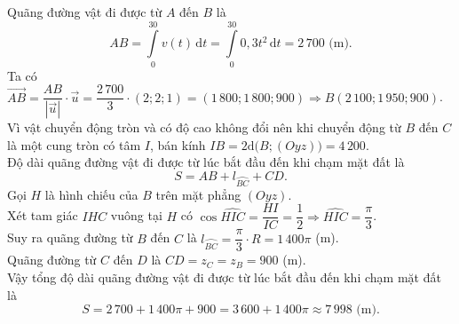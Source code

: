 \begin{ex}
{\begin{center}
\begin{tikzpicture}[scale=1.1, line join=round, line cap=round, >=stealth]
			\end{tikzpicture}
		\end{center}
		Quãng đường vật đi được từ $A$ đến $B$ là 
		\[AB = \displaystyle \int\limits_0^{30} v(t) \mathrm{\,d}t = \int\limits_0^{30} 0{,}3t^2 \mathrm{\,d}t = 2\,700\text{ (m).}\]
		Ta có $\overrightarrow{AB} = \dfrac{AB}{\left|\overrightarrow{u}\right|} \cdot \overrightarrow{u} = \dfrac{2\,700}{3}\cdot (2; 2; 1) = (1\,800; 1\,800; 900) \Rightarrow B(2\,100; 1\,950; 900)$.\\
		Vì vật chuyển động tròn và có độ cao không đổi nên khi chuyển động từ $B$ đến $C$ là một cung tròn có tâm $I$, bán kính $IB = 2\mathrm{d}\big(B; (Oyz)\big) = 4\,200$.\\
		Độ dài quãng đường vật đi được từ lúc bắt đầu đến khi chạm mặt đất là
		\[S = AB + l_{\wideparen{BC}} + CD.\]
		Gọi $H$ là hình chiếu của $B$ trên mặt phẳng $(Oyz)$.\\
		Xét tam giác $IHC$ vuông tại $H$ có $\cos \widehat{HIC} = \dfrac{HI}{IC} = \dfrac{1}{2} \Rightarrow \widehat{HIC} = \dfrac{\pi}{3}$.\\
		Suy ra quãng đường từ $B$ đến $C$ là $l_{\wideparen{BC}} = \dfrac{\pi}{3} \cdot R = 1\,400\pi$ (m).\\
		Quãng đường từ $C$ đến $D$ là $CD = z_C = z_B = 900$ (m).\\
		Vậy tổng độ dài quãng đường vật đi được từ lúc bắt đầu đến khi chạm mặt đất là
		\[S = 2\,700 + 1\,400\pi + 900 = 3\,600 + 1\,400\pi \approx 7\,998 \text{ (m).}\]
	}
\end{ex}

